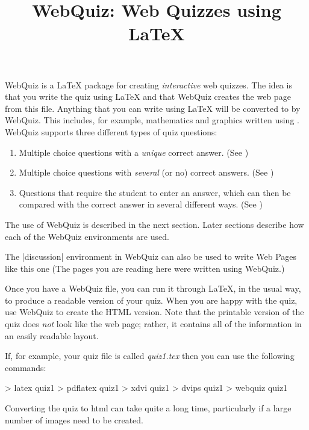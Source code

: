 \documentclass[svgnames]{webquiz}
\title{WebQuiz: Web Quizzes using LaTeX}
\newcommand\WebQuiz{WebQuiz\xspace}
\begin{document}
\begin{discussion}[Introduction]
  \WebQuiz is a \LaTeX{} package for creating \textit{interactive}
  web quizzes.  The idea is that you write the quiz using \LaTeX{} and that
  \WebQuiz creates the web page from this file. Anything that you can
  write using \LaTeX{} will be converted to \HTML by \WebQuiz. This
  includes, for example, mathematics and graphics written using
  .  \WebQuiz supports three different types of quiz
  questions:

  \begin{enumerate}
  \item Multiple choice questions with a \emph{unique} correct answer.
 (See )
  \item Multiple choice questions with \emph{several} (or no)
    correct answers.
 (See )
  \item Questions that require the student to enter an answer, which
  can then be compared with the correct answer in several different
  ways. (See )
  \end{enumerate}
The use of \WebQuiz is described in the next section. Later
sections describe how each of the \WebQuiz environments are used.

The \LatexCode|discussion| environment in \WebQuiz can also be used to
write Web Pages like this one (The pages you are reading here were
written using \WebQuiz.)
\end{discussion}
\begin{discussion}
Once you have a \WebQuiz file, you can run it through \LaTeX, in
the usual way, to produce a readable version of your quiz. When you
are happy with the quiz, use \WebQuiz to create the HTML
version. Note that the printable version of the quiz does \emph{not}
look like the web page; rather, it contains all of the information in
an easily readable layout.

  If, for example, your quiz file is called \emph{quiz1.tex} then you
  can use the following commands:
\begin{latexcode}
      > latex quiz1             %
      > pdflatex quiz1          %
      > xdvi quiz1              %
      > dvips quiz1             %
      > webquiz quiz1           %
\end{latexcode}
  Converting the quiz to html can take quite a long time, particularly
  if a large number of images need to be created.

\end{discussion}
\end{document}
